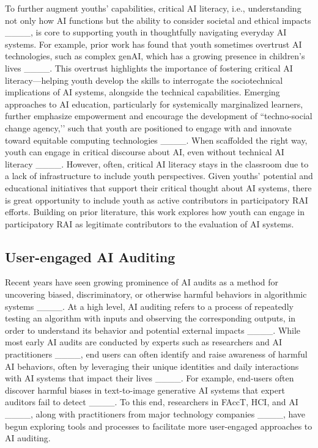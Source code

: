 To further augment youths’ capabilities, critical AI literacy, i.e., understanding not only how AI functions but the ability to consider societal and ethical impacts ____, is core to supporting youth in thoughtfully navigating everyday AI systems. For example, prior work has found that youth sometimes overtrust AI technologies, such as complex genAI, which has a growing presence in children’s lives ____. This overtrust highlights the importance of fostering critical AI literacy—helping youth develop the skills to interrogate the sociotechnical implications of AI systems, alongside the technical capabilities. Emerging approaches to AI education, particularly for systemically marginalized learners, further emphasize empowerment and encourage the development of ``techno-social change agency,’’ such that youth are positioned to engage with and innovate toward equitable computing technologies ____.
When scaffolded the right way, youth can engage in critical discourse about AI, even without technical AI literacy ____. However, often, critical AI literacy stays in the classroom due to a lack of infrastructure to include youth perspectives. Given youths’ potential and educational initiatives that support their critical thought about AI systems, there is great opportunity to include youth as active contributors in participatory RAI efforts. Building on prior literature, this work explores how youth can engage in participatory RAI as legitimate contributors to the evaluation of AI systems.

\subsection{User-engaged AI Auditing}
Recent years have seen growing prominence of AI audits as a method for uncovering biased, discriminatory, or otherwise harmful behaviors in algorithmic systems ____. At a high level, AI auditing refers to a process of repeatedly testing an algorithm with inputs and observing the corresponding outputs, in order to understand its behavior and potential external impacts ____. While most early AI audits are conducted by experts such as researchers and AI practitioners ____, end users can often identify and raise awareness of harmful AI behaviors, often by leveraging their unique identities and daily interactions with AI systems that impact their lives ____. For example, end-users often discover harmful biases in text-to-image generative AI systems that expert auditors fail to detect ____. To this end, researchers in FAccT, HCI, and AI ____, along with practitioners from major technology companies ____, have begun exploring tools and processes to facilitate more user-engaged approaches to AI auditing.

